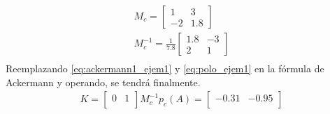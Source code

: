 \documentclass[12pt]{article}
\begin{document}
\begin{itemize}
\begin{equation}
\begin{split}
            M_{c}=
            \begin{bmatrix}
                1 & 3 \\
                -2 & 1.8
            \end{bmatrix}\\
            M^{-1}_{c}=\frac{1}{7.8}
            \begin{bmatrix}
                1.8 & -3 \\
                2 & 1
            \end{bmatrix}\\
        \end{split}
        \label{eq:ackermann1_ejem1}
    \end{equation}
    Reemplazando \ref{eq:ackermann1_ejem1} y \ref{eq:polo_ejem1} en la fórmula de Ackermann y operando, se tendrá finalmente.
    \begin{equation}
        \begin{split}
            K=
            \begin{bmatrix}
                0 & 1 \\
            \end{bmatrix}
            M^{-1}_{c}p_{c}(A)
            =
            \begin{bmatrix}
                -0.31 & -0.95 \\
            \end{bmatrix}
        \end{split}
        \label{eq:ackermann_ejem1_result}
    \end{equation}


\end{itemize}


\end{document}
